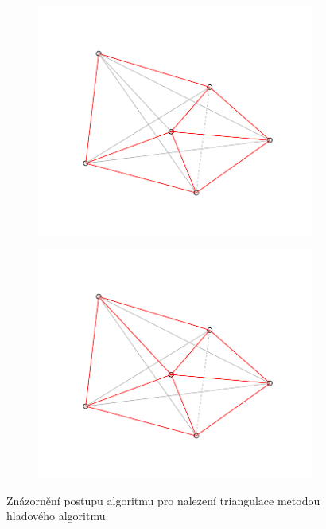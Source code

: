 \begin{figure}[h]
\begin{subfigure}{0.25\textwidth}
  \includegraphics[width=\linewidth]{./pictures/4/triangulation_11.pdf}
  \label{fig:3-triangulation_11}
\end{subfigure}\hfil %
\begin{subfigure}{0.25\textwidth}
  \includegraphics[width=\linewidth]{./pictures/4/triangulation_12.pdf}
  \label{fig:3-triangulation_12}
\end{subfigure}\hfil %

\caption{Znázornění postupu algoritmu pro nalezení triangulace metodou hladového algoritmu.}
\label{fig:3-triangulation}
\end{figure}	
	
